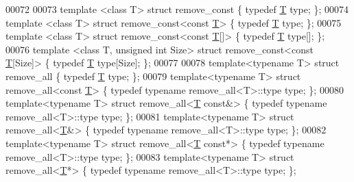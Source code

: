\begin{DoxyCode}
00072 
00073 \textcolor{keyword}{template} <\textcolor{keyword}{class} T> \textcolor{keyword}{struct }remove\_const \{ \textcolor{keyword}{typedef} \hyperlink{group___sparse_core___module_class_eigen_1_1_triplet}{T} type; \};
00074 \textcolor{keyword}{template} <\textcolor{keyword}{class} T> \textcolor{keyword}{struct }remove\_const<const \hyperlink{group___sparse_core___module_class_eigen_1_1_triplet}{T}> \{ \textcolor{keyword}{typedef} \hyperlink{group___sparse_core___module_class_eigen_1_1_triplet}{T} type; \};
00075 \textcolor{keyword}{template} <\textcolor{keyword}{class} T> \textcolor{keyword}{struct }remove\_const<const \hyperlink{group___sparse_core___module_class_eigen_1_1_triplet}{T}[]> \{ \textcolor{keyword}{typedef} \hyperlink{group___sparse_core___module_class_eigen_1_1_triplet}{T} type[]; \};
00076 \textcolor{keyword}{template} <\textcolor{keyword}{class} T, \textcolor{keywordtype}{unsigned} \textcolor{keywordtype}{int} Size> \textcolor{keyword}{struct }remove\_const<const \hyperlink{group___sparse_core___module_class_eigen_1_1_triplet}{T}[Size]> \{ \textcolor{keyword}{typedef} 
      \hyperlink{group___sparse_core___module_class_eigen_1_1_triplet}{T} type[Size]; \};
00077 
00078 \textcolor{keyword}{template}<\textcolor{keyword}{typename} T> \textcolor{keyword}{struct }remove\_all \{ \textcolor{keyword}{typedef} \hyperlink{group___sparse_core___module_class_eigen_1_1_triplet}{T} type; \};
00079 \textcolor{keyword}{template}<\textcolor{keyword}{typename} T> \textcolor{keyword}{struct }remove\_all<const \hyperlink{group___sparse_core___module_class_eigen_1_1_triplet}{T}>   \{ \textcolor{keyword}{typedef} \textcolor{keyword}{typename} remove\_all<T>::type type; \};
00080 \textcolor{keyword}{template}<\textcolor{keyword}{typename} T> \textcolor{keyword}{struct }remove\_all<\hyperlink{group___sparse_core___module_class_eigen_1_1_triplet}{T} const&>  \{ \textcolor{keyword}{typedef} \textcolor{keyword}{typename} remove\_all<T>::type type; \};
00081 \textcolor{keyword}{template}<\textcolor{keyword}{typename} T> \textcolor{keyword}{struct }remove\_all<\hyperlink{group___sparse_core___module_class_eigen_1_1_triplet}{T}&>        \{ \textcolor{keyword}{typedef} \textcolor{keyword}{typename} remove\_all<T>::type type; \};
00082 \textcolor{keyword}{template}<\textcolor{keyword}{typename} T> \textcolor{keyword}{struct }remove\_all<\hyperlink{group___sparse_core___module_class_eigen_1_1_triplet}{T} const*>  \{ \textcolor{keyword}{typedef} \textcolor{keyword}{typename} remove\_all<T>::type type; \};
00083 \textcolor{keyword}{template}<\textcolor{keyword}{typename} T> \textcolor{keyword}{struct }remove\_all<\hyperlink{group___sparse_core___module_class_eigen_1_1_triplet}{T}*>        \{ \textcolor{keyword}{typedef} \textcolor{keyword}{typename} remove\_all<T>::type type; \};

\end{DoxyCode}
